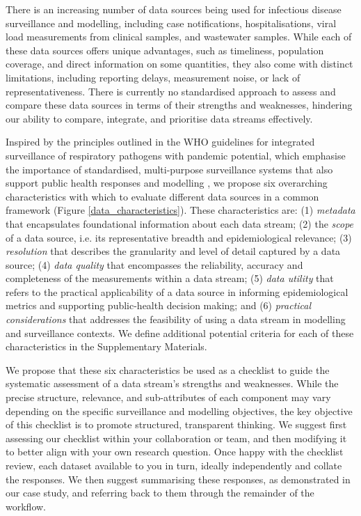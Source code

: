 \documentclass{article}
\begin{document}
There is an increasing number of data sources being used for infectious disease surveillance and modelling, including case notifications, hospitalisations, viral load measurements from clinical samples, and wastewater samples. While each of these data sources offers unique advantages, such as timeliness, population coverage, and direct information on some quantities, they also come with distinct limitations, including reporting delays,  measurement noise, or lack of representativeness. There is currently no standardised approach to assess and compare these data sources in terms of their strengths and weaknesses, hindering our ability to compare, integrate, and prioritise data streams effectively. 

Inspired by the principles outlined in the WHO guidelines for integrated surveillance of respiratory pathogens with pandemic potential, which emphasise the importance of standardised, multi-purpose surveillance systems that also support public health responses and modelling \citep{world2024implementing}, we propose six overarching characteristics with which to evaluate different data sources in a common framework (Figure \ref{data_characteristics}).  These characteristics are: (1) \textit{metadata}  that encapsulates foundational information about each data stream; (2) the \textit{scope} of a data source, i.e. its representative breadth and epidemiological relevance; (3) \textit{resolution} that describes the granularity and level of detail captured by a data source; (4) \textit{data quality} that encompasses the reliability, accuracy and completeness of the measurements within a data stream; (5) \textit{data utility} that refers to the practical applicability of a data source in informing epidemiological metrics and supporting public-health decision making; and (6)\textit{ practical considerations} that addresses the feasibility of using a data stream in modelling and surveillance contexts. We define additional potential criteria for each of these characteristics in the Supplementary Materials. 

We propose that these six characteristics be used as a checklist to guide the systematic assessment of a data stream's strengths and weaknesses. While the precise structure, relevance, and sub-attributes of each component may vary depending on the specific surveillance and modelling objectives, the key objective of this checklist is to promote structured, transparent thinking. We suggest first assessing our checklist within your collaboration or team,  and then modifying it to better align with your own research question. Once happy with the checklist review, each dataset available to you in turn, ideally independently and collate the responses. We then suggest summarising these responses, as demonstrated in our case study, and referring back to them through the remainder of the workflow.
\end{document}
